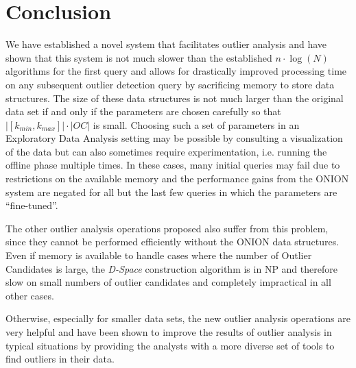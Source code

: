 \documentclass[runningheads]{llncs}
\begin{document}
\section{Conclusion}
We have established a novel system that facilitates outlier analysis and have shown that this system is not much slower than the established $n\cdot \log(N)$ algorithms for the first query and allows for drastically improved processing time on any subsequent outlier detection query by sacrificing memory to store data structures. The size of these data structures is not much larger than the original data set if and only if the parameters are chosen carefully so that $|[k_{min},k_{max}]| \cdot |OC|$ is small. Choosing such a set of parameters in an Exploratory Data Analysis setting may be possible by consulting a visualization of the data but can also sometimes require experimentation, i.e. running the offline phase multiple times. In these cases, many initial queries may fail due to restrictions on the available memory and the performance gains from the ONION system are negated for all but the last few queries in which the parameters are ``fine-tuned''. 

The other outlier analysis operations proposed also suffer from this problem, since they cannot be performed efficiently without the ONION data structures. Even if memory is available to handle cases where the number of Outlier Candidates is large, the \emph{D-Space} construction algorithm is in NP and therefore slow on small numbers of outlier candidates and completely impractical in all other cases.

Otherwise, especially for smaller data sets, the new outlier analysis operations are very helpful and have been shown \cite{onion} to improve the results of outlier analysis in typical situations by providing the analysts with a more diverse set of tools to find outliers in their data.

%


  
\end{document}
